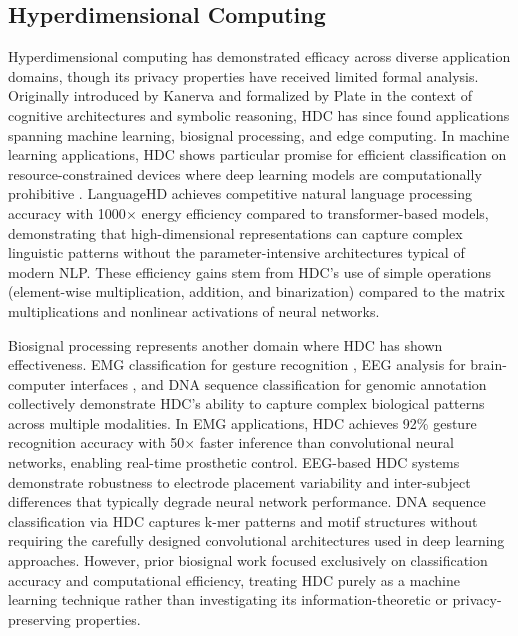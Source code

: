 \documentclass[11pt,letterpaper]{article}
\begin{document}
\subsection{Hyperdimensional Computing}

Hyperdimensional computing has demonstrated efficacy across diverse application domains, though its privacy properties have received limited formal analysis. Originally introduced by Kanerva \cite{kanerva2009} and formalized by Plate \cite{plate1995} in the context of cognitive architectures and symbolic reasoning, HDC has since found applications spanning machine learning, biosignal processing, and edge computing. In machine learning applications, HDC shows particular promise for efficient classification on resource-constrained devices where deep learning models are computationally prohibitive \cite{imani2019framework,rahimi2020}. LanguageHD \cite{imani2019adapthd} achieves competitive natural language processing accuracy with 1000$\times$ energy efficiency compared to transformer-based models, demonstrating that high-dimensional representations can capture complex linguistic patterns without the parameter-intensive architectures typical of modern NLP. These efficiency gains stem from HDC's use of simple operations (element-wise multiplication, addition, and binarization) compared to the matrix multiplications and nonlinear activations of neural networks.

Biosignal processing represents another domain where HDC has shown effectiveness. EMG classification for gesture recognition \cite{hernandez2019}, EEG analysis for brain-computer interfaces \cite{burrello2020}, and DNA sequence classification for genomic annotation \cite{poduval2020} collectively demonstrate HDC's ability to capture complex biological patterns across multiple modalities. In EMG applications, HDC achieves 92\% gesture recognition accuracy with 50$\times$ faster inference than convolutional neural networks, enabling real-time prosthetic control. EEG-based HDC systems demonstrate robustness to electrode placement variability and inter-subject differences that typically degrade neural network performance. DNA sequence classification via HDC captures k-mer patterns and motif structures without requiring the carefully designed convolutional architectures used in deep learning approaches. However, prior biosignal work focused exclusively on classification accuracy and computational efficiency, treating HDC purely as a machine learning technique rather than investigating its information-theoretic or privacy-preserving properties.
\end{document}

